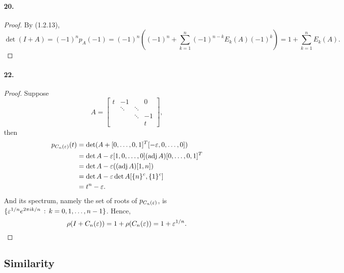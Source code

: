   \paragraph{20.}
  \begin{proof}
    By (1.2.13), 
    \[
      \det(I+A) = (-1)^n p_A(-1) = 
      (-1)^n\left((-1)^n + \sum_{k=1}^n(-1)^{n-k}E_k(A)(-1)^k \right)
      = 1 + \sum_{k=1}^n E_k(A).
    \]
  \end{proof}

  \paragraph{22.} 
  \begin{proof}
    Suppose
    \[
      A = 
      \begin{bmatrix}
        t    & -1     &        & 0 \\
             & \ddots & \ddots &   \\
             &        & \ddots & -1 \\
             &        &        & t
      \end{bmatrix},
    \]
    then
    \begin{align*}
      p_{C_n(\varepsilon)}(t)
      &= \det(A + [0,\dots,0,1]^T [-\varepsilon,0,\dots,0]) \\
      &= \det A - \varepsilon [1, 0,\dots,0](\operatorname{adj} A) [0,\dots,0,1]^T \\
      &= \det A - \varepsilon ((\operatorname{adj} A)[1,n]) \\
      &= \det A - \varepsilon \det A[\{n\}^c, \{1\}^c] \\
      &= t^n - \varepsilon.
    \end{align*}
    And its spectrum, namely the set of roots of $p_{C_n(\varepsilon)}$, is $\{
    \varepsilon^{1/n} e^{2\pi ik/n}\,:\,k=0,1,\dots,n-1\}$. Hence,
    \[
      \rho(I+C_n(\varepsilon)) = 1 + \rho(C_n(\varepsilon)) = 1+\varepsilon^{1/n}.
    \]
  \end{proof}  


\subsection{Similarity}
